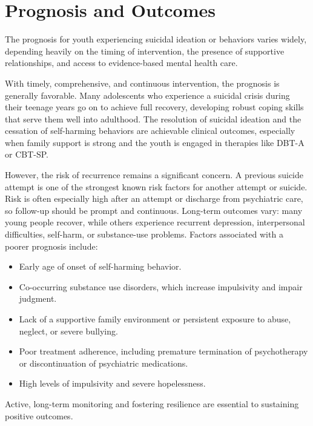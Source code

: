 \section*{Prognosis and Outcomes}
The prognosis for youth experiencing suicidal ideation or behaviors varies widely, depending heavily on the timing of intervention, the presence of supportive relationships, and access to evidence-based mental health care.

With timely, comprehensive, and continuous intervention, the prognosis is generally favorable. Many adolescents who experience a suicidal crisis during their teenage years go on to achieve full recovery, developing robust coping skills that serve them well into adulthood. The resolution of suicidal ideation and the cessation of self-harming behaviors are achievable clinical outcomes, especially when family support is strong and the youth is engaged in therapies like DBT-A or CBT-SP.

However, the risk of recurrence remains a significant concern. A previous suicide attempt is one of the strongest known risk factors for another attempt or suicide. Risk is often especially high after an attempt or discharge from psychiatric care, so follow-up should be prompt and continuous. Long-term outcomes vary: many young people recover, while others experience recurrent depression, interpersonal difficulties, self-harm, or substance-use problems. Factors associated with a poorer prognosis include:
\begin{itemize}
    \item Early age of onset of self-harming behavior.
    \item Co-occurring substance use disorders, which increase impulsivity and impair judgment.
    \item Lack of a supportive family environment or persistent exposure to abuse, neglect, or severe bullying.
    \item Poor treatment adherence, including premature termination of psychotherapy or discontinuation of psychiatric medications.
    \item High levels of impulsivity and severe hopelessness.
\end{itemize}
Active, long-term monitoring and fostering resilience are essential to sustaining positive outcomes.

